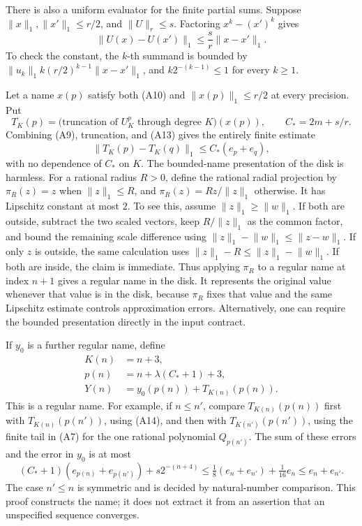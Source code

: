 There is also a uniform evaluator for the finite partial sums. Suppose
\(\lVert x\rVert_1,\lVert x'\rVert_1\leq r/2\), and
\(\lVert U\rVert_r\leq s\). Factoring \(x^k-(x')^k\) gives
\[
 \lVert U(x)-U(x')\rVert_1
 \leq \frac{s}{r}\lVert x-x'\rVert_1.
 \tag{A13}\label{eq:polynomial-eval-lipschitz}
\]
To check the constant, the \(k\)-th summand is bounded by
\(\lVert u_k\rVert_1 k(r/2)^{k-1}\lVert x-x'\rVert_1\),
and \(k2^{-(k-1)}\leq1\) for every \(k\geq1\).

Let a name \(x(p)\) satisfy both (A10) and
\(\lVert x(p)\rVert_1\leq r/2\) at every precision. Put
\[
 T_K(p)=\bigl(\text{truncation of }U_K^p
                    \text{ through degree }K\bigr)(x(p)),
 \qquad C_* =2m+s/r.
\]
Combining (A9), truncation, and (A13) gives the entirely finite estimate
\[
 \lVert T_K(p)-T_K(q)\rVert_1
       \leq C_*(e_p+e_q),
 \tag{A14}\label{eq:partial-sum-name}
\]
with no dependence of \(C_*\) on \(K\).
The bounded-name presentation of the disk is harmless. For a rational
radius \(R>0\), define the rational radial projection by
\(\pi_R(z)=z\) when \(\lVert z\rVert_1\leq R\), and
\(\pi_R(z)=Rz/\lVert z\rVert_1\) otherwise. It has Lipschitz
constant at most \(2\). To see this, assume
\(\lVert z\rVert_1\geq\lVert w\rVert_1\). If both are outside,
subtract the two scaled vectors, keep \(R/\lVert z\rVert_1\) as
the common factor, and bound the remaining scale difference using
\(\lVert z\rVert_1-\lVert w\rVert_1\leq\lVert z-w\rVert_1\).
If only \(z\) is outside, the same calculation uses
\(\lVert z\rVert_1-R\leq\lVert z\rVert_1-\lVert w\rVert_1\).
If both are inside, the claim is immediate. Thus applying \(\pi_R\)
to a regular name at index \(n+1\) gives a regular name in the disk.
It represents the original value whenever that value is in the disk,
because \(\pi_R\) fixes that value and the same Lipschitz estimate
controls approximation errors. Alternatively, one can require the
bounded presentation directly in the input contract.

If \(y_0\) is a further regular name, define
\[
 \begin{split}
 K(n)&=n+3,\\
 p(n)&=n+\lambda(C_*+1)+3,\\
 Y(n)&=y_0(p(n))+T_{K(n)}(p(n)).
 \end{split}
 \tag{A15}\label{eq:root-name}
\]
This is a regular name. For example, if \(n\leq n'\), compare
\(T_{K(n)}(p(n))\) first with \(T_{K(n)}(p(n'))\), using (A14),
and then with \(T_{K(n')}(p(n'))\), using the finite tail in (A7)
for the one rational polynomial \(Q_{p(n')}\). The sum of these
errors and the error in \(y_0\) is at most
\[
 (C_*+1)(e_{p(n)}+e_{p(n')})
          +s2^{-(n+4)}
 \leq\tfrac18(e_n+e_{n'})+\tfrac1{16}e_n
 \leq e_n+e_{n'}.
\]
The case \(n'\leq n\) is symmetric and is decided by natural-number
comparison. This proof constructs the name; it does not extract it from
an assertion that an unspecified sequence converges.

